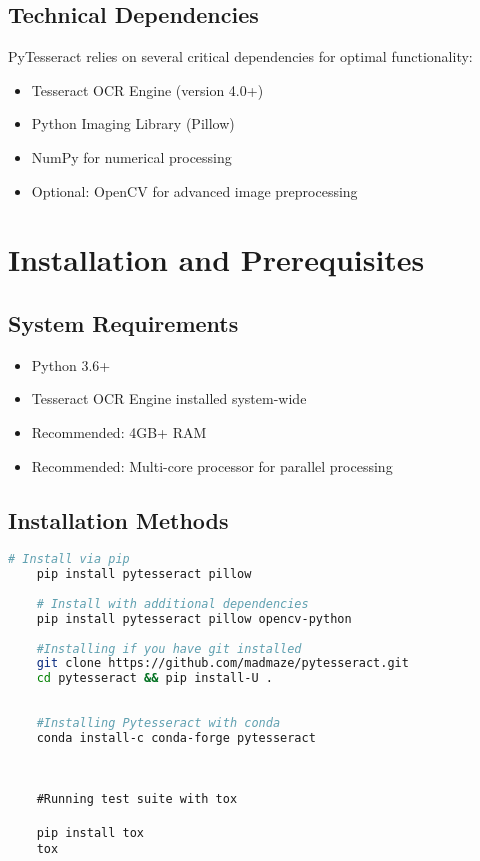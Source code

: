\subsection{Technical Dependencies}
PyTesseract relies on several critical dependencies for optimal functionality:

\begin{itemize}
	\item Tesseract OCR Engine (version 4.0+)
	\item Python Imaging Library (Pillow)
	\item NumPy for numerical processing
	\item Optional: OpenCV for advanced image preprocessing
\end{itemize}


\section{Installation and Prerequisites}
\subsection{System Requirements}
\begin{itemize}
	\item Python 3.6+
	\item Tesseract OCR Engine installed system-wide
	\item Recommended: 4GB+ RAM
	\item Recommended: Multi-core processor for parallel processing
\end{itemize}


\subsection{Installation Methods}
\begin{lstlisting}[language=bash]
	# Install via pip
	pip install pytesseract pillow
	
	# Install with additional dependencies
	pip install pytesseract pillow opencv-python
	
	#Installing if you have git installed
	git clone https://github.com/madmaze/pytesseract.git
	cd pytesseract && pip install-U .
	
	
	#Installing Pytesseract with conda
	conda install-c conda-forge pytesseract
	
\end{lstlisting}


\begin{lstlisting}
	
	#Running test suite with tox
	
	pip install tox
	tox
	
\end{lstlisting}






